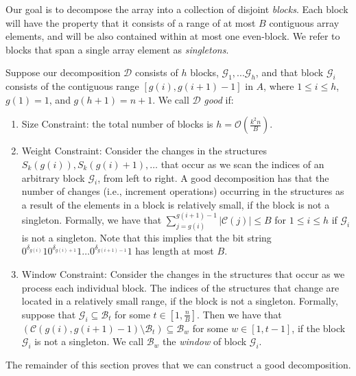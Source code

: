 \documentclass[runningheads]{llncs}
\newcommand{\opset}{\mathcal{C}}
\newcommand{\Oh}{\mathcal{O}}
\begin{document}
Our goal is to decompose the array into a collection of disjoint
\emph{blocks}.  Each block will have the property that it consists of
a range of at most $B$ contiguous array elements, and will be also
contained within at most one even-block.  We refer to blocks that span
a single array element as \emph{singletons}.

Suppose our decomposition $\mathcal{D}$ consists of $h$ blocks,
$\mathcal{G}_1, ... \mathcal{G}_h$, and that block $\mathcal{G}_i$
consists of the contiguous range $[g(i),g(i+1)-1]$ in $A$, where $1
\le i \le h$, $g(1) = 1$, and $g(h+1) = n+1$.  We call $\mathcal{D}$
\emph{good} if:

\begin{enumerate}[label=\bfseries D\arabic*]

\item \label{en:size-const} Size Constraint: the total number of
  blocks is $h = \Oh(\frac{k^2 n }{ B})$.

\item \label{en:weight-const} Weight Constraint: Consider the changes
  in the structures $S_k(g(i)), S_k(g(i)+1), \ldots$ that occur as we
  scan the indices of an arbitrary block $\mathcal{G}_i$, from left to
  right.  A good decomposition has that the number of changes (i.e.,
  increment operations) occurring in the structures as a result of the
  elements in a block is relatively small, if the block is not a
  singleton.  Formally, we have that $\sum_{j = g(i)}^{g(i+1)-1} |
  \opset(j) | \le B$ for $1 \le i \le h$ if $\mathcal{G}_i$ is not a
  singleton.  Note that this implies that the bit string
  $0^{\delta_{g(i)}}10^{\delta_{g(i)+1}}1\ldots0^{\delta_{g(i+1)-1}}1$
  has length at most $B$.

\item \label{en:window-const} Window Constraint: Consider the changes
  in the structures that occur as we process each individual block.
  The indices of the structures that change are located in a
  relatively small range, if the block is not a singleton.  Formally,
  suppose that $\mathcal{G}_i \subseteq \mathcal{B}_t$ for some $t \in
  [1,\frac{n}{B}]$.  Then we have that $(\opset(g(i),g(i+1)-1) \setminus
  \mathcal{B}_t) \subseteq \mathcal{B}_{w}$ for some $w \in [1,t-1]$,
  if the block $\mathcal{G}_i$ is not a singleton.  We call
  $\mathcal{B}_w$ the \emph{window} of block $\mathcal{G}_i$.

\end{enumerate}

The remainder of this section proves that we can construct a good
decomposition.
\end{document}
